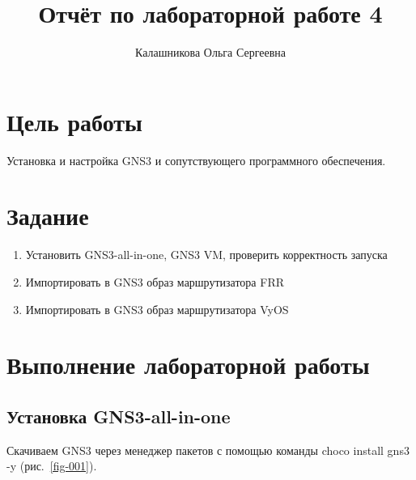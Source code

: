 \documentclass[
  english,
  russian,
  12pt,
  a4paper,
  DIV=11,
  numbers=noendperiod]{scrreprt}
\title{Отчёт по лабораторной работе 4}
\author{Калашникова Ольга Сергеевна}
\date{}
\renewcommand*\contentsname{Содержание}
\newcommand\contentsname{Содержание}
\begin{document}
\maketitle

\renewcommand*\contentsname{Содержание}
{
\setcounter{tocdepth}{1}
\tableofcontents
}
\listoffigures
\listoftables

\chapter{Цель
работы}\label{ux446ux435ux43bux44c-ux440ux430ux431ux43eux442ux44b}

Установка и настройка GNS3 и сопутствующего программного обеспечения.

\chapter{Задание}\label{ux437ux430ux434ux430ux43dux438ux435}

\begin{enumerate}
\def\labelenumi{\arabic{enumi}.}
\item
  Установить GNS3-all-in-one, GNS3 VM, проверить корректность запуска
\item
  Импортировать в GNS3 образ маршрутизатора FRR
\item
  Импортировать в GNS3 образ маршрутизатора VyOS
\end{enumerate}

\chapter{Выполнение лабораторной
работы}\label{ux432ux44bux43fux43eux43bux43dux435ux43dux438ux435-ux43bux430ux431ux43eux440ux430ux442ux43eux440ux43dux43eux439-ux440ux430ux431ux43eux442ux44b}

\section{Установка
GNS3-all-in-one}\label{ux443ux441ux442ux430ux43dux43eux432ux43aux430-gns3-all-in-one}

Скачиваем GNS3 через менеджер пакетов с помощью команды choco install
gns3 -y (рис.~\ref{fig-001}).
\end{document}
